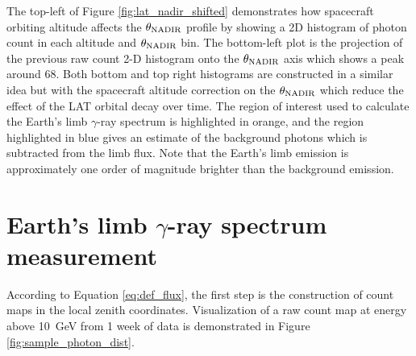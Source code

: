 The top-left of Figure \ref{fig:lat_nadir_shifted} demonstrates how 
spacecraft orbiting altitude
affects the $\theta_{\rm NADIR}$ profile by showing a 2D histogram
of photon count in each altitude and $\theta_{\rm NADIR}$ bin.
The bottom-left plot is the projection of the
previous raw count 2-D histogram
onto the $\theta_{\rm NADIR}$ axis which shows
a peak around 68\textdegree. Both bottom and top right histograms
are constructed in a similar idea but with the spacecraft altitude
correction on the $\theta_{\rm NADIR}$ which reduce the effect
of the LAT orbital decay over time. The region of interest used
to calculate the Earth's limb $\gamma$-ray spectrum is
highlighted in orange, and the region highlighted in blue
gives an estimate of the background photons which is subtracted
from the limb flux. Note that the Earth's limb emission is
approximately one order of magnitude brighter than the background
emission.



\section{Earth's limb $\gamma$-ray spectrum measurement}

According to Equation \ref{eq:def_flux}, 
the first step is the construction of
count maps in the local zenith coordinates.
Visualization of a raw count map at energy above 10~GeV from 1 week of
data is demonstrated in Figure \ref{fig:sample_photon_dist}.

